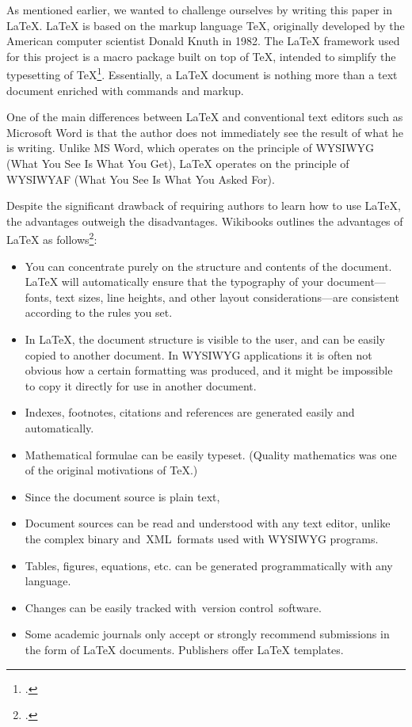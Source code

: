 As mentioned earlier, we wanted to challenge ourselves by writing this paper in \LaTeX{}. \LaTeX{} is based on the markup language TeX, originally developed by the American computer scientist Donald Knuth in 1982. The \LaTeX{} framework used for this project is \dq a macro package built on top of TeX\dq , intended to \dq simplify the typesetting of TeX\dq \footcite{wikibooks_latex_nodate}. Essentially, a \LaTeX{} document is nothing more than a text document enriched with commands and markup.

One of the main differences between \LaTeX{} and conventional text editors such as Microsoft Word is that the author does not immediately see the result of what he is writing. Unlike MS Word, which operates on the principle of WYSIWYG (What You See Is What You Get), \LaTeX{} operates on the principle of WYSIWYAF (What You See Is What You Asked For).

Despite the significant drawback of requiring authors to learn how to use \LaTeX{}, the advantages outweigh the disadvantages. Wikibooks outlines the advantages of \LaTeX{} as follows\footcite{wikibooks_latex_nodate}:
\begin{itemize}
    \item You can concentrate purely on the structure and contents of the document. \LaTeX{} will automatically ensure that the typography of your document—fonts, text sizes, line heights, and other layout considerations—are consistent according to the rules you set.
    \item In \LaTeX{}, the document structure is visible to the user, and can be easily copied to another document. In WYSIWYG applications it is often not obvious how a certain formatting was produced, and it might be impossible to copy it directly for use in another document.
    \item Indexes, footnotes, citations and references are generated easily and automatically.
    \item Mathematical formulae can be easily typeset. (Quality mathematics was one of the original motivations of TeX.)
    \item Since the document source is plain text,
    \item Document sources can be read and understood with any text editor, unlike the complex binary and XML formats used with WYSIWYG programs.
    \item Tables, figures, equations, etc. can be generated programmatically with any language.
    \item Changes can be easily tracked with version control software.
    \item Some academic journals only accept or strongly recommend submissions in the form of \LaTeX{} documents. Publishers offer \LaTeX{} templates.
\end{itemize}

